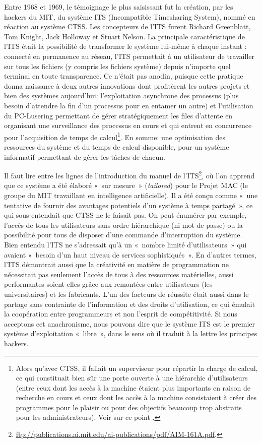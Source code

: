 \documentclass{FramateX}
\begin{document}
\begin{refsection}
Entre 1968 et 1969, le témoignage le plus saisissant fut la création,
par les hackers du MIT, du système ITS (Incompatible Timesharing
System), nommé en réaction au système CTSS. Les concepteurs de l'ITS
furent Richard Greenblatt, Tom Knight, Jack Holloway et Stuart Nelson.
La principale caractéristique de l'ITS était la possibilité de
transformer le système lui-même à chaque instant : connecté en
permanence au réseau, l'ITS permettait à un
utilisateur de travailler sur tous les fichiers (y compris les fichiers
système) depuis n'importe quel terminal en toute
transparence. Ce n'était pas anodin, puisque cette pratique donna
naissance à deux autres innovations dont profitèrent les autres projets
et bien des systèmes aujourd'hui: l'exploitation
asynchrone des processus (plus besoin d'attendre la
fin d'un processus pour en entamer un autre) et
l'utilisation du PC-Lusering permettant de gérer
stratégiquement les files d'attente en organisant une
surveillance des processus en cours et qui entrent en concurrence
pour l'acquisition de temps de calcul\footnote{Alors
qu'avec CTSS, il fallait un superviseur pour répartir la charge de
calcul, ce qui constituait bien sûr une porte ouverte à une hiérarchie
d'utilisateurs (entre ceux dont les accès à la machine étaient plus
importants en raison de recherche en cours et ceux dont les accès à la
machine consistaient à créer des programmes pour le plaisir ou pour des
objectifs beaucoup trop abstraits pour les administrateurs). Voir sur
ce point \cite{garfinkelarchitects1999}.}. En somme: une optimisation des
ressources du système et du temps de calcul disponible, pour un système
informatif permettant de gérer les tâches de chacun.

Il faut lire entre les lignes de l'introduction du manuel de
l'ITS\footnote{\url{ftp://publications.ai.mit.edu/ai-publications/pdf/AIM-161A.pdf}.},
où l'on apprend que ce système a été élaboré «~sur mesure~»
(\textit{tailored}) pour le Projet MAC (le groupe du MIT travaillant en
intelligence artificielle). Il a été conçu comme «~une tentative de
fournir des avantages potentiels d'un système à temps partagé~», ce qui
sous-entendait que CTSS ne le faisait pas. On peut énumérer par
exemple, l'accès de tous les utilisateurs sans ordre hiérarchique (ni
mot de passe) ou la possibilité pour tous de disposer d'une commande
d'interruption du système. Bien entendu l'ITS ne s'adressait qu'à un
«~nombre limité d'utilisateurs~» qui avaient «~besoin d'un haut niveau
de services sophistiqués~». En d'autres termes, l'ITS démontrait aussi
que la créativité en matière de programmation ne nécessitait pas
seulement l'accès de tous à des ressources matérielles, aussi
performantes soient-elles grâce aux remontées entre utilisateurs (les
universitaires) et les fabricants. L'un des facteurs de réussite était
aussi dans le partage sans contrainte de l'information et des droits
d'utilisation, ce qui émulait la coopération entre programmeurs et non
l'esprit de compétitivité. Si nous acceptons cet anachronisme, nous
pouvons dire que le système ITS est le premier système d'exploitation
«~libre~», dans le sens où il traduit à la lettre les principes
hackers.


\end{refsection}
\end{document}

